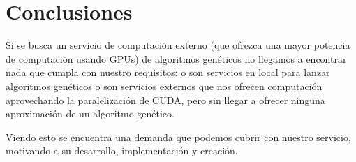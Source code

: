\bigskip
\section{Conclusiones}
\bigskip

Si se busca un servicio de computación externo (que ofrezca una mayor potencia de computación usando GPUs) de algoritmos genéticos no llegamos a encontrar nada que cumpla con nuestro requisitos: o son servicios en local para lanzar algoritmos genéticos o son servicios externos que nos ofrecen computación aprovechando la paralelización de CUDA, pero sin llegar a ofrecer ninguna aproximación de un algoritmo genético.

Viendo esto se encuentra una demanda que podemos cubrir con nuestro servicio, motivando a su desarrollo, implementación y creación.







